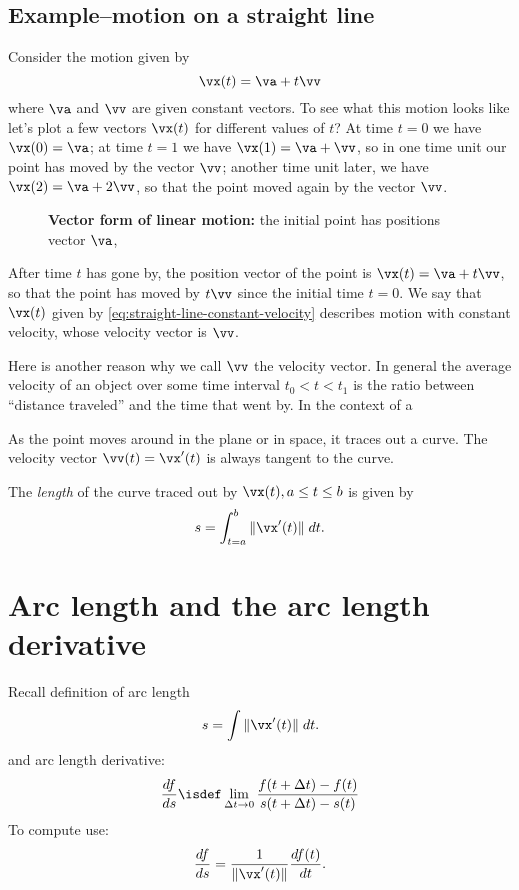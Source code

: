 \subsection{Example--motion on a straight line} %
Consider the motion given by
\begin{equation}
  \vx(t) = \va + t\vv
  \label{eq:straight-line-constant-velocity}
\end{equation}
where $\va $ and $\vv$ are given constant vectors.  To see what this
motion looks like let's plot a few vectors $\vx(t)$ for different
values of $t$?  At time $t=0$ we have $\vx(0) = \va$; at time $t=1$ we
have $\vx(1) = \va+\vv$, so in one time unit our point has moved by
the vector $\vv$; another time unit later, we have $\vx(2) =
\va+2\vv$, so that the point moved again by the vector $\vv$.
\begin{figure}[h]
  \centering
  
  \caption{\textbf{Vector form of linear motion: } the initial point
    has positions vector $\va$, }
  \label{fig:vector-form-linear-motion}
\end{figure}
After time $t$ has gone by, the position vector of the point is
$\vx(t) = \va+t\vv$, so that the point has moved by $t\vv$ since the
initial time $t=0$.  We say that $\vx(t)$ given by
\eqref{eq:straight-line-constant-velocity} describes motion with
constant velocity, whose velocity vector is $\vv$.

Here is another reason why we call $\vv$ the velocity vector.  In general the
average velocity of an object over some time interval $t_0<t<t_1$ is the ratio
between ``distance traveled'' and the time that went by.  In the context of a

As the point moves around in the plane or in space, it traces out a curve.  The
velocity vector $\vv(t) = \vx'(t)$ is always tangent to the curve.

The \emph{length} of the curve traced out by $\vx(t), a\le t\le b$ is given by
\[
s = \int_{t=a}^b \|\vx'(t)\|\; dt.
\]


\section{Arc length and the arc length derivative} %
Recall definition of arc length
\begin{equation}
  \label{eq:arclength-def}
  s = \int \|\vx'(t)\|\; dt.
\end{equation}
and arc length derivative:
\begin{equation}
  \frac{df}{ds} \isdef
  \lim_{\Delta t\to 0}
  \frac{f(t+\Delta t) - f(t)}{s(t+\Delta t) - s(t)}
  \label{eq:arc-length-deriv-def}
\end{equation}
To compute use:
\begin{equation}
  \frac{df}{ds} = \frac{1}{\|\vx'(t)\|} \frac{df(t)}{dt}.
  \label{eq:arclenght-deriv}
\end{equation}
